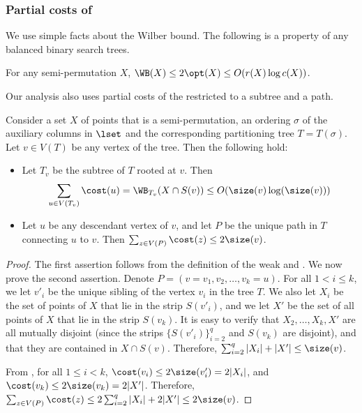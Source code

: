\documentclass{toc}
\begin{document}
\subsubsection{Partial costs of \WBone}

We use simple facts about the Wilber bound. The following is a property of any balanced binary search trees. 

\begin{lemma}\label{cor: upper bound on WB}
	For any semi-permutation $X$, 
	$\WB(X)\leq 2\opt(X) \leq O(r(X) \log c(X))$.
\end{lemma}

Our analysis also uses partial costs of the \WBone restricted to a subtree and a path. 

\begin{claim}\label{claim: bounds on WB for path and subtree}
Consider a set $X$ of points that is a semi-permutation, an ordering $\sigma$ of the auxiliary columns in $\lset$ and the corresponding partitioning tree $T=T(\sigma)$.  
%
 Let $v\in V(T)$ be any vertex of the tree. Then the following hold:
	\begin{itemize}
\item Let $T_v$ be the %
subtree   %
of $T$ rooted at $v$. Then $$\sum_{u\in V(T_v)}\cost(u) = \WB_{T_v}(X \cap S(v)) \leq O(\size(v)\log(\size(v)))$$
		\item Let $u$ be any descendant vertex of $v$, and let $P$ be the unique path in $T$ connecting $u$ to $v$. Then $\sum_{z\in V(P)}\cost(z)\leq 2\size(v)$.
	\end{itemize}
\end{claim}

\begin{proof}
    The first assertion follows from the definition of the weak \WBone and . We now prove the second assertion. Denote $P=(v=v_1,v_2,\ldots,v_k=u)$. For all $1<i\leq k$, we let $v'_i$ be the unique sibling of the vertex $v_i$ in the tree $T$. We also let $X_i$ be the set of points of $X$ that lie in the strip $S(v'_i)$, and we let $X'$ be the set of all points of $X$ that lie in the strip $S(v_k)$. 
It is easy to verify that $X_2,\ldots,X_k,X'$ are all mutually disjoint (since the strips $\{S(v'_i)\}_{i=2}^q$ and $S(v_k)$ are disjoint), and that they are contained in $X\cap S(v)$. 
Therefore, $\sum_{i=2}^q|X_i|+|X'|\leq \size(v)$.
	
	From , for all $1\leq i<k$, $\cost(v_i)\leq 2\size(v'_i)=2|X_i|$, and $\cost(v_k)\leq 2\size(v_k)=2|X'|$. Therefore, $\sum_{z\in V(P)}\cost(z)\leq 2\sum_{i=2}^q|X_i|+2|X'|\leq 2\size(v)$.
\end{proof}
\end{document}
